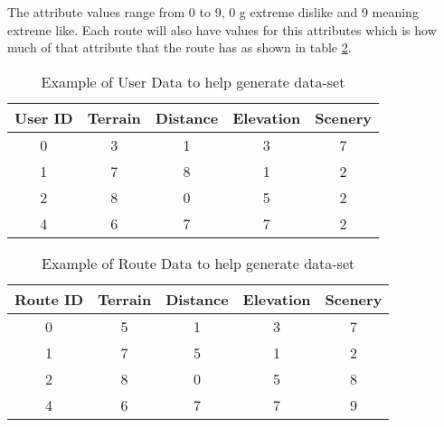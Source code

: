 The attribute values range from 0 to 9, 0 g extreme dislike and 9 meaning extreme like. Each route will also have values for this attributes which is how much of that attribute that the route has as shown in table \ref{tab:genRouteDataset}.

\begin{table}[ht]
    \centering
    \begin{tabular}{|c|c|c|c|c|}
        \hline
         User ID & Terrain & Distance & Elevation & Scenery  \\
         \hline
         \hline
         0 & 3 & 1 & 3 & 7  \\
         1 & 7 & 8 & 1 & 2 \\
         2 & 8 & 0 & 5 & 2 \\
         4 & 6 & 7 & 7 & 2 \\
         \hline
    \end{tabular}
    \caption{Example of User Data to help generate data-set}
    \label{tab:genUserDataset}
\end{table}

\begin{table}[ht]
    \centering
    \begin{tabular}{|c|c|c|c|c|}
        \hline
         Route ID & Terrain & Distance & Elevation & Scenery  \\
         \hline
         \hline
         0 & 5 & 1 & 3 & 7  \\
         1 & 7 & 5 & 1 & 2 \\
         2 & 8 & 0 & 5 & 8 \\
         4 & 6 & 7 & 7 & 9 \\
         \hline
    \end{tabular}
    \caption{Example of Route Data to help generate data-set}
    \label{tab:genRouteDataset}
\end{table}

